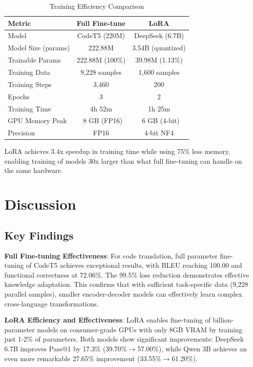 \documentclass[conference]{IEEEtran}
\begin{document}
\begin{table}[htbp]
\caption{Training Efficiency Comparison}
\begin{center}
\begin{tabular}{|l|c|c|}
\hline
\textbf{Metric} & \textbf{Full Fine-tune} & \textbf{LoRA} \\
\hline
Model & CodeT5 (220M) & DeepSeek (6.7B) \\
Model Size (params) & 222.88M & 3.54B (quantized) \\
Trainable Params & 222.88M (100\%) & 39.98M (1.13\%) \\
\hline
Training Data & 9,228 samples & 1,600 samples \\
Training Steps & 3,460 & 200 \\
Epochs & 3 & 2 \\
\hline
Training Time & 4h 52m & 1h 25m \\
GPU Memory Peak & ~8 GB (FP16) & ~6 GB (4-bit) \\
Precision & FP16 & 4-bit NF4 \\
\hline
\end{tabular}
\label{tab:efficiency}
\end{center}
\end{table}

LoRA achieves 3.4x speedup in training time while using 75\% less memory, enabling training of models 30x larger than what full fine-tuning can handle on the same hardware.

\section{Discussion}

\subsection{Key Findings}

\textbf{Full Fine-tuning Effectiveness}: For code translation, full parameter fine-tuning of CodeT5 achieves exceptional results, with BLEU reaching 100.00 and functional correctness at 72.06\%. The 99.5\% loss reduction demonstrates effective knowledge adaptation. This confirms that with sufficient task-specific data (9,228 parallel samples), smaller encoder-decoder models can effectively learn complex cross-language transformations.

\textbf{LoRA Efficiency and Effectiveness}: LoRA enables fine-tuning of billion-parameter models on consumer-grade GPUs with only 8GB VRAM by training just 1-2\% of parameters. Both models show significant improvements: DeepSeek 6.7B improves Pass@1 by 17.3\% (39.70\%$\rightarrow$57.00\%), while Qwen 3B achieves an even more remarkable 27.65\% improvement (33.55\%$\rightarrow$61.20\%).
\end{document}
